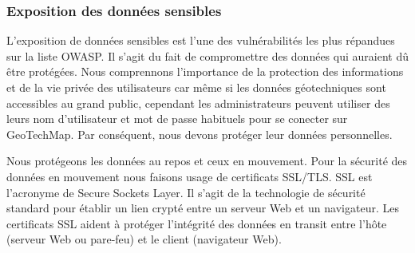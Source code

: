     \subsubsection{Exposition des données sensibles}
        L'exposition de données sensibles est l'une des vulnérabilités les plus répandues sur la liste OWASP. 
        Il s'agit du fait de compromettre des données qui auraient dû être protégées.
        Nous comprennons l’importance de la protection des informations et de 
        la vie privée des utilisateurs car même si les données géotechniques sont accessibles au grand public,
        cependant les administrateurs peuvent utiliser des leurs nom d'utilisateur et mot de passe habituels pour se
        conecter sur GeoTechMap. Par conséquent, nous devons protéger leur données personnelles. 
        \par 
        Nous protégeons les données au repos et ceux en mouvement. Pour la sécurité des données en mouvement
        nous faisons usage de certificats SSL/TLS.
        SSL est l'acronyme de Secure Sockets Layer. Il s'agit de la technologie de sécurité standard pour 
        établir un lien crypté entre un serveur Web et un navigateur. Les certificats SSL aident à 
        protéger l'intégrité des données en transit entre l'hôte (serveur Web ou pare-feu) et le client 
        (navigateur Web).
        \par 

